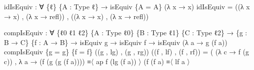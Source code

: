 \documentclass[
  11pt,
  oneside,
  article]{memoir}
\newenvironment{Shaded}{}{}
\newcommand{\NormalTok}[1]{#1}
\newcommand{\OtherTok}[1]{\textcolor[rgb]{0.00,0.44,0.13}{#1}}
\theoremstyle{definition}
\theoremstyle{plain}
\newcommand{\0}{\textsf{0}}
\newcommand{\1}{\tn{\textsf{1}}}
\begin{document}
\begin{Shaded}
\begin{Highlighting}[]
\NormalTok{idIsEquiv }\OtherTok{:} \OtherTok{∀} \OtherTok{\{}\NormalTok{ℓ}\OtherTok{\}} \OtherTok{\{}\NormalTok{A }\OtherTok{:}\NormalTok{ Type ℓ}\OtherTok{\}} \OtherTok{→}\NormalTok{ isEquiv }\OtherTok{\{}\NormalTok{A }\OtherTok{=}\NormalTok{ A}\OtherTok{\}} \OtherTok{(λ}\NormalTok{ x }\OtherTok{→}\NormalTok{ x}\OtherTok{)}
\NormalTok{idIsEquiv }\OtherTok{=} \OtherTok{((λ}\NormalTok{ x }\OtherTok{→}\NormalTok{ x}\OtherTok{)}\NormalTok{ , }\OtherTok{(λ}\NormalTok{ x }\OtherTok{→}\NormalTok{ refl}\OtherTok{))}\NormalTok{ , }\OtherTok{((λ}\NormalTok{ x }\OtherTok{→}\NormalTok{ x}\OtherTok{)}\NormalTok{ , }\OtherTok{(λ}\NormalTok{ x }\OtherTok{→}\NormalTok{ refl}\OtherTok{))}

\NormalTok{compIsEquiv }\OtherTok{:} \OtherTok{∀} \OtherTok{\{}\NormalTok{ℓ0 ℓ1 ℓ2}\OtherTok{\}} \OtherTok{\{}\NormalTok{A }\OtherTok{:}\NormalTok{ Type ℓ0}\OtherTok{\}} \OtherTok{\{}\NormalTok{B }\OtherTok{:}\NormalTok{ Type ℓ1}\OtherTok{\}} \OtherTok{\{}\NormalTok{C }\OtherTok{:}\NormalTok{ Type ℓ2}\OtherTok{\}}
              \OtherTok{→} \OtherTok{\{}\NormalTok{g }\OtherTok{:}\NormalTok{ B }\OtherTok{→}\NormalTok{ C}\OtherTok{\}} \OtherTok{\{}\NormalTok{f }\OtherTok{:}\NormalTok{ A }\OtherTok{→}\NormalTok{ B}\OtherTok{\}} \OtherTok{→}\NormalTok{ isEquiv g }\OtherTok{→}\NormalTok{ isEquiv f}
              \OtherTok{→}\NormalTok{ isEquiv }\OtherTok{(λ}\NormalTok{ a }\OtherTok{→}\NormalTok{ g }\OtherTok{(}\NormalTok{f a}\OtherTok{))}
\NormalTok{compIsEquiv }\OtherTok{\{}\NormalTok{g }\OtherTok{=}\NormalTok{ g}\OtherTok{\}} \OtherTok{\{}\NormalTok{f }\OtherTok{=}\NormalTok{ f}\OtherTok{\}} 
            \OtherTok{((}\NormalTok{g\textquotesingle{} , lg}\OtherTok{)}\NormalTok{ , }\OtherTok{(}\NormalTok{g\textquotesingle{}\textquotesingle{} , rg}\OtherTok{))} 
            \OtherTok{((}\NormalTok{f\textquotesingle{} , lf}\OtherTok{)}\NormalTok{ , }\OtherTok{(}\NormalTok{f\textquotesingle{}\textquotesingle{} , rf}\OtherTok{))} \OtherTok{=}
      \OtherTok{(} \OtherTok{(λ}\NormalTok{ c }\OtherTok{→}\NormalTok{ f\textquotesingle{} }\OtherTok{(}\NormalTok{g\textquotesingle{} c}\OtherTok{))}   
\NormalTok{      , }\OtherTok{λ}\NormalTok{ a }\OtherTok{→} \OtherTok{(}\NormalTok{f\textquotesingle{} }\OtherTok{(}\NormalTok{g\textquotesingle{} }\OtherTok{(}\NormalTok{g }\OtherTok{(}\NormalTok{f a}\OtherTok{))))}\NormalTok{   ≡〈 ap f\textquotesingle{} }\OtherTok{(}\NormalTok{lg }\OtherTok{(}\NormalTok{f a}\OtherTok{))}\NormalTok{ 〉 }
              \OtherTok{(}\NormalTok{f\textquotesingle{} }\OtherTok{(}\NormalTok{f a}\OtherTok{)}\NormalTok{             ≡〈 lf a 〉 }

\end{Highlighting}
\end{Shaded}
\end{document}

